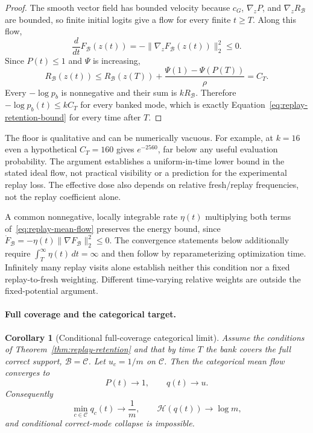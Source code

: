 \documentclass{article}
\newcommand{\1}{\mathbf 1}
\newtheorem{corollary}[lemma]{Corollary}
\theoremstyle{remark}
\theoremstyle{definition}
\theoremstyle{plain}
\begin{document}
\begin{proof}
The smooth vector field has bounded velocity because $c_G$,
$\nabla_zP$, and $\nabla_zR_{\mathcal B}$ are bounded, so finite initial
logits give a flow for every finite $t\ge T$. Along this flow,
\[
  \frac{d}{dt}F_{\mathcal B}(z(t))
  =-\lVert\nabla_zF_{\mathcal B}(z(t))\rVert_2^2\le0.
\]
Since $P(t)\le1$ and $\Psi$ is increasing,
\[
  R_{\mathcal B}(z(t))
  \le R_{\mathcal B}(z(T))
     +\frac{\Psi(1)-\Psi(P(T))}{\rho}
  =C_T.
\]
Every $-\log p_b$ is nonnegative and their sum is
$kR_{\mathcal B}$. Therefore
$-\log p_b(t)\le kC_T$ for every banked mode, which is exactly
Equation~\eqref{eq:replay-retention-bound} for every time after $T$.
\end{proof}


The floor is qualitative and can be numerically vacuous. For example, at
$k=16$ even a hypothetical $C_T=160$ gives $e^{-2560}$, far below any useful
evaluation probability. The argument establishes a uniform-in-time lower
bound in the stated ideal flow, not practical visibility or a prediction for
the experimental replay loss. The effective dose also depends on relative
fresh/replay frequencies, not the replay coefficient alone.

A common nonnegative, locally integrable rate $\eta(t)$ multiplying both
terms of~\eqref{eq:replay-mean-flow} preserves the energy bound, since
$\dot F_{\mathcal B}=-\eta(t)\|\nabla F_{\mathcal B}\|_2^2\le0$.
The convergence statements below additionally require
$\int_T^\infty\eta(t)\,dt=\infty$ and then follow by reparameterizing
optimization time. Infinitely many replay visits alone establish neither
this condition nor a fixed replay-to-fresh weighting. Different time-varying
relative weights are outside the fixed-potential argument.

\paragraph{Full coverage and the categorical target.}
\begin{corollary}[Conditional full-coverage categorical limit]
\label{cor:replay-no-collapse}
Assume the conditions of Theorem~\ref{thm:replay-retention} and that by time
$T$ the bank covers the full correct support, $\mathcal B=\mathcal C$. Let
$u_c=1/m$ on $\mathcal C$. Then the categorical mean flow converges to
\[
  P(t)\longrightarrow1,
  \qquad q(t)\longrightarrow u.
\]
Consequently
\[
  \min_{c\in\mathcal C}q_c(t)\longrightarrow\frac1m,
  \qquad
  \mathcal H(q(t))\longrightarrow\log m,
\]
and conditional correct-mode collapse is impossible.
\end{corollary}
\end{document}
